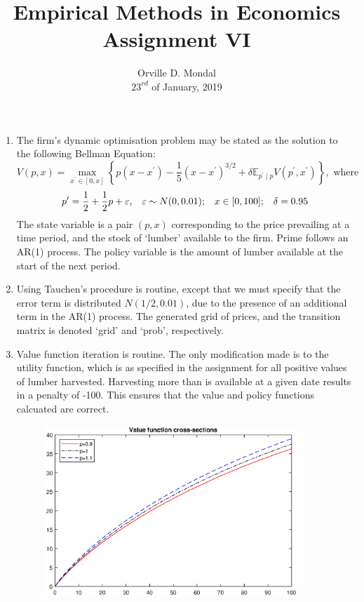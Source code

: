 \documentclass[12pt,a4paper]{article}
\title{Empirical Methods in Economics\\\small{Assignment VI}\vspace{-9ex}}
\date{Orville D. Mondal\\ $23^{rd}$ of January, 2019\vspace{-3ex}}
\newcommand{\E}{\mathbb{E}}
\begin{document}
\maketitle
\begin{enumerate}[1.]
\item The firm's dynamic optimisation problem may be stated as the solution to the following Bellman Equation:
\[V(p,x)=\max_{x^\prime\in[0,x]}\left\{p(x-x^\prime)-\frac{1}{5}(x-x^\prime)^{3/2}+\delta\E_{p^\prime\mid p}V(p^\prime,x^\prime)\right\},\text{ where }\]
\[p^\prime=\frac{1}{2}+\frac{1}{2}p+\varepsilon,\hspace{3mm}\varepsilon\sim N(0,0.01);\hspace{3mm} x\in [0,100]; \hspace{3mm} \delta=0.95\]
The state variable is a pair $(p,x)$ corresponding to the price prevailing at a time period, and the stock of `lumber' available to the firm. Prime follows an AR(1) process. The policy variable is the amount of lumber available at the start of the next period. 
\item Using Tauchen's procedure is routine, except that we must specify that the error term is distributed $N(1/2,0.01)$, due to the presence of an additional term in the AR(1) process. The generated grid of prices, and the transition matrix is denoted `grid' and `prob', respectively. 
\item Value function iteration is routine. The only modification made is to the utility function, which is as specified in the assignment for all positive values of lumber harvested. Harvesting more than is available at a given date results in a penalty of -100. This ensures that the value and policy functions calcuated are correct.  
\begin{figure}[h]
\begin{center}
\includegraphics[width=0.9\textwidth]{value.eps}\vspace{-3ex}

\end{center}
\end{figure}
\end{enumerate}
\end{document}
